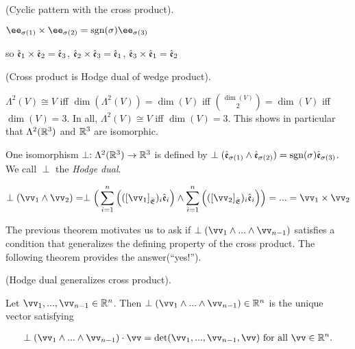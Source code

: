 \begin{theorem}
    (Cyclic pattern with the cross product).
    
     $\ee_{\sigma(1)} \times \ee_{\sigma(2)} = \sgn(\sigma) \ee_{\sigma(3)}$
     
     so $\hat{\mathfrak{e}}_1 \times \hat{\mathfrak{e}}_2 = \hat{\mathfrak{e}}_3$, $\hat{\mathfrak{e}}_2 \times \hat{\mathfrak{e}}_3 = \hat{\mathfrak{e}}_1$, $\hat{\mathfrak{e}}_3 \times \hat{\mathfrak{e}}_1 = \hat{\mathfrak{e}}_2$
\end{theorem}

\begin{deriv}
    (Cross product is Hodge dual of wedge product).
    
    $\Lambda^2(V) \cong V$ iff $\dim(\Lambda^2(V)) = \dim(V)$ iff $\binom{\dim(V)}{2} = \dim(V)$ iff $\dim(V) = 3$. In all, $\Lambda^2(V) \cong V$ iff $\dim(V) = 3$. This shows in particular that $\Lambda^2(\mathbb{R}^3)$ and $\mathbb{R}^3$ are isomorphic.
    
    One isomorphism $\perp:\Lambda^2(\mathbb{R}^3) \rightarrow \mathbb{R}^3$ is defined by $\perp(\hat{\mathfrak{e}}_{\sigma(1)} \wedge \hat{\mathfrak{e}}_{\sigma(2)}) = \text{sgn}(\sigma) \hat{\mathfrak{e}}_{\sigma(3)}$. We call $\perp$ the \textit{Hodge dual}.
    
    
    \begin{align*}
        \perp(\vv_1 \wedge \vv_2)
        = \perp\Big( \sum_{i = 1}^n \Big( ([\vv_1]_\sE)_i \see_i \Big) \wedge \sum_{i = 1}^n \Big( ([\vv_2]_\sE)_i \see_i \Big) \Big)
        = ...
        = \vv_1 \times \vv_2
    \end{align*}
\end{deriv}

The previous theorem motivates us to ask if $\perp(\vv_1 \wedge ... \wedge \vv_{n - 1})$ satisfies a condition that generalizes the defining property of the cross product. The following theorem provides the answer(``yes!'').

\begin{theorem}
    (Hodge dual generalizes cross product).

    Let $\vv_1, ..., \vv_{n - 1} \in \R^n$. Then $\perp(\vv_1 \wedge ... \wedge \vv_{n - 1}) \in \R^n$ is the unique vector satisfying
    
     \begin{align*}
         \perp(\vv_1 \wedge ... \wedge \vv_{n - 1}) \cdot \vv = \det(\vv_1, ..., \vv_{n - 1}, \vv) \text{ for all $\vv \in \R^n$}.
     \end{align*}
\end{theorem}

